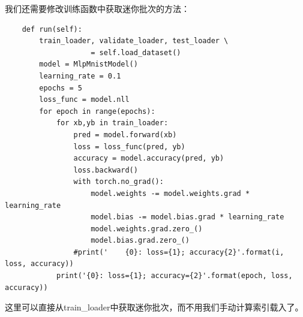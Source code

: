 \documentclass[UTF8]{article}
\begin{document}
我们还需要修改训练函数中获取迷你批次的方法：
\begin{lstlisting}
    def run(self):
        train_loader, validate_loader, test_loader \
                    = self.load_dataset()
        model = MlpMnistModel()
        learning_rate = 0.1
        epochs = 5
        loss_func = model.nll
        for epoch in range(epochs):
            for xb,yb in train_loader:
                pred = model.forward(xb)
                loss = loss_func(pred, yb)
                accuracy = model.accuracy(pred, yb)
                loss.backward()
                with torch.no_grad():
                    model.weights -= model.weights.grad * learning_rate
                    model.bias -= model.bias.grad * learning_rate
                    model.weights.grad.zero_()
                    model.bias.grad.zero_()
                #print('    {0}: loss={1}; accuracy{2}'.format(i, loss, accuracy))
            print('{0}: loss={1}; accuracy={2}'.format(epoch, loss, accuracy))
\end{lstlisting}
这里可以直接从train\_loader中获取迷你批次，而不用我们手动计算索引载入了。
\end{document}
